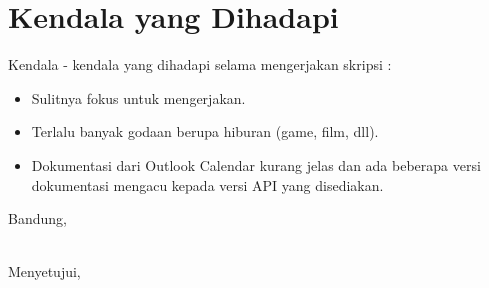 \documentclass[a4paper,twoside]{article}
\begin{document}
\section{Kendala yang Dihadapi}
Kendala - kendala yang dihadapi selama mengerjakan skripsi :
\begin{itemize}
	\item Sulitnya fokus untuk mengerjakan. 
	\item Terlalu banyak godaan berupa hiburan (game, film, dll). 
	\item Dokumentasi dari Outlook Calendar kurang jelas dan ada beberapa versi dokumentasi mengacu kepada versi API yang disediakan.
\end{itemize}

\vspace{1cm}
\centering Bandung, \tanggal\\
\vspace{2cm} \nama \\ 
\vspace{1cm}

Menyetujui, \\
\end{document}
